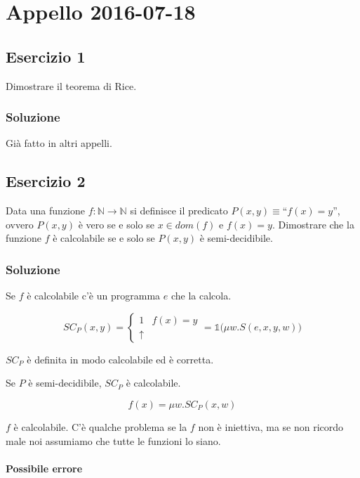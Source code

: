 \section{Appello 2016-07-18}


\subsection{Esercizio 1}

Dimostrare il teorema di Rice.

\subsubsection{Soluzione}

Già fatto in altri appelli.

\subsection{Esercizio 2}

Data una funzione $f : \mathbb{N} \rightarrow \mathbb{N}$ si definisce il predicato $P(x,y) \equiv \text{``}f(x) = y\text{''}$, ovvero $P(x,y)$ è vero se e solo se $x \in dom(f)$ e $f(x) = y$. Dimostrare che la funzione $f$ è calcolabile se e solo se $P(x,y)$ è semi-decidibile.

\subsubsection{Soluzione}

Se $f$ è calcolabile c'è un programma $e$ che la calcola.

$$
SC_P(x,y) = \begin{cases}
1 &f(x) = y \\
\uparrow
\end{cases}  = \mathbb{1}\bigg( \mu w. S(e,x,y,w) \bigg)
$$

$SC_P$ è definita in modo calcolabile ed è corretta.

Se $P$ è semi-decidibile, $SC_P$ è calcolabile.

$$
f(x) = \mu w. SC_P(x,w)
$$

$f$ è calcolabile. C'è qualche problema se la $f$ non è iniettiva, ma se non ricordo male noi assumiamo che tutte le funzioni lo siano.

\paragraph{Possibile errore}

